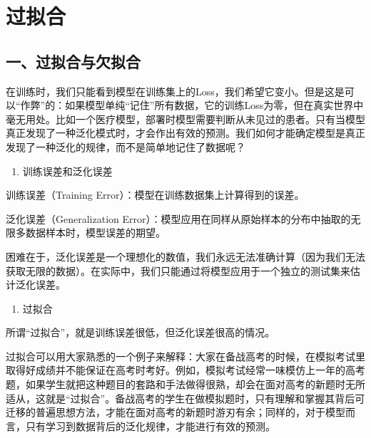 \setcounter{section}{3}

\hypertarget{ux8fc7ux62dfux5408}{%
\section{过拟合}\label{ux8fc7ux62dfux5408}}

\hypertarget{ux4e00ux8fc7ux62dfux5408ux4e0eux6b20ux62dfux5408}{%
\subsection{一、过拟合与欠拟合}\label{ux4e00ux8fc7ux62dfux5408ux4e0eux6b20ux62dfux5408}}

在训练时，我们只能看到模型在训练集上的Loss，我们希望它变小。但是这是可以``作弊''的：如果模型单纯``记住''所有数据，它的训练Loss为零，但在真实世界中毫无用处。比如一个医疗模型，部署时模型需要判断从未见过的患者。只有当模型真正发现了一种泛化模式时，才会作出有效的预测。我们如何才能确定模型是真正发现了一种泛化的规律，而不是简单地记住了数据呢？

\begin{enumerate}
\def\labelenumi{\arabic{enumi}.}
\tightlist
\item
  训练误差和泛化误差
\end{enumerate}

训练误差（Training Error）：模型在训练数据集上计算得到的误差。

泛化误差（Generalization Error）：模型应用在同样从原始样本的分布中抽取的无限多数据样本时，模型误差的期望。

困难在于，泛化误差是一个理想化的数值，我们永远无法准确计算（因为我们无法获取无限的数据）。在实际中，我们只能通过将模型应用于一个独立的测试集来估计泛化误差。

\begin{enumerate}
\def\labelenumi{\arabic{enumi}.}
\setcounter{enumi}{1}
\tightlist
\item
  过拟合
\end{enumerate}

所谓``过拟合''，就是训练误差很低，但泛化误差很高的情况。

过拟合可以用大家熟悉的一个例子来解释：大家在备战高考的时候，在模拟考试里取得好成绩并不能保证在高考时考好。例如，模拟考试经常一味模仿上一年的高考题，如果学生就把这种题目的套路和手法做得很熟，却会在面对高考的新题时无所适从，这就是``过拟合''。备战高考的学生在做模拟题时，只有理解和掌握其背后可迁移的普遍思想方法，才能在面对高考的新题时游刃有余；同样的，对于模型而言，只有学习到数据背后的泛化规律，才能进行有效的预测。


